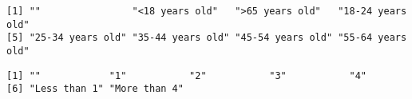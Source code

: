 \documentclass[
  letterpaper,
  DIV=11,
  numbers=noendperiod]{scrreprt}
\newenvironment{Shaded}{\begin{snugshade}}{\end{snugshade}}
\newcommand{\FunctionTok}[1]{\textcolor[rgb]{0.28,0.35,0.67}{#1}}
\newcommand{\NormalTok}[1]{\textcolor[rgb]{0.00,0.23,0.31}{#1}}
\newcommand{\SpecialCharTok}[1]{\textcolor[rgb]{0.37,0.37,0.37}{#1}}
\begin{document}
\begin{Shaded}
\end{Shaded}

\begin{verbatim}
[1] ""                "<18 years old"   ">65 years old"   "18-24 years old"
[5] "25-34 years old" "35-44 years old" "45-54 years old" "55-64 years old"
\end{verbatim}

\begin{Shaded}
\end{Shaded}

\begin{verbatim}
[1] ""            "1"           "2"           "3"           "4"          
[6] "Less than 1" "More than 4"
\end{verbatim}

\begin{Shaded}
\end{Shaded}
\end{document}
